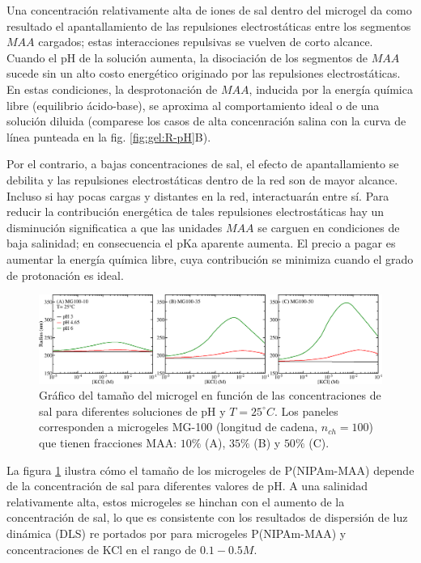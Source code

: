 Una concentraci\'on relativamente alta de iones de sal dentro del microgel da como resultado el apantallamiento de las repulsiones electrost\'aticas entre los segmentos $MAA$ cargados; estas interacciones repulsivas se vuelven de corto alcance.
Cuando el pH de la soluci\'on aumenta, la disociación de los segmentos de $MAA$ sucede sin un alto costo energ\'etico originado por las repulsiones electrost\'aticas.
En estas condiciones, la desprotonaci\'on de $MAA$, inducida por la energ\'ia qu\'imica libre (equilibrio \'acido-base), se aproxima al comportamiento ideal o de una soluci\'on diluida (comparese los casos de alta concenraci\'on salina  con la curva de l\'inea punteada en la fig. \ref{fig:gel:R-pH}B).



Por el contrario, a bajas concentraciones de sal, el efecto de apantallamiento se debilita y las repulsiones electrost\'aticas dentro de la red son de mayor alcance.
Incluso si hay pocas cargas y distantes en la red, interactuar\'an entre s\'i.
Para reducir la contribuci\'on energ\'etica de tales repulsiones electrost\'aticas hay un disminuci\'on significatica a que  las unidades $MAA$ se carguen en condiciones de baja salinidad;
en consecuencia el pKa aparente aumenta.
El precio a pagar es aumentar la energ\'ia química libre, cuya contribuci\'on se minimiza cuando el grado de protonaci\'on es ideal.



\begin{figure}[!htb]
	\centering
	\includegraphics[width=1\linewidth]{Figures/graph-gel/R-cs.png}
	\caption{Gr\'afico del tama\~no del microgel en funci\'on de las concentraciones de sal para diferentes soluciones de pH y $T=25 ^\circ C$.
		Los paneles corresponden a microgeles MG-100 (longitud de cadena, $n_{ch}=100$) que tienen fracciones MAA: $10\%$ (A), $35\%$ (B) y $50\%$ (C).}
	\label{fig:gel:R-cs}
\end{figure}

La figura \ref{fig:gel:R-cs} ilustra c\'omo el tama\~no de los microgeles de P(NIPAm-MAA) depende de la concentraci\'on de sal para diferentes valores de pH.
A una salinidad relativamente alta, estos microgeles se hinchan con el aumento de la concentraci\'on de sal, lo que es consistente con los resultados de dispersi\'on de luz din\'amica (DLS) re portados por  \citet{Wong2009} para microgeles P(NIPAm-MAA) y concentraciones de KCl en el rango de $0.1-0.5 M$.

